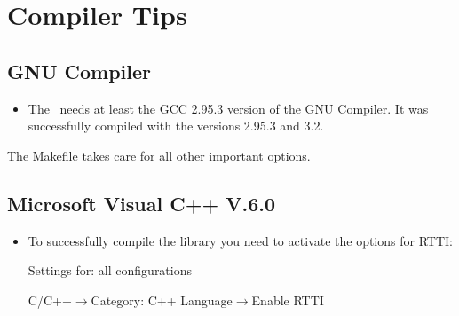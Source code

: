\chapter{Compiler Tips}
\label{chap:compiler}

\section{GNU Compiler}

\begin{itemize}
\item The \ltilib\ needs at least the GCC 2.95.3 version of the GNU Compiler.
It was successfully compiled with the versions 2.95.3 and 3.2.
\end{itemize}

The Makefile takes care for all other important options.

\section{Microsoft Visual C++ V.6.0}

\begin{itemize}
\item To successfully compile the library you need to activate the options
  for RTTI: 
  
  Settings for: all configurations

  C/C++$\rightarrow$Category: C++ Language$\rightarrow$Enable RTTI
 
\end{itemize}











